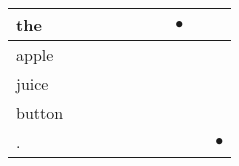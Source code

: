 \documentclass[landscape]{article}
\newcommand{\ssp}{\hspace{2pt}}
\newcommand{\mex}{\cellcolor{g}$\bullet$}
\begin{document}
\begin{tabular}{|l|p{10pt}|p{10pt}|p{10pt}|p{10pt}|p{10pt}|p{10pt}|p{10pt}|p{10pt}|p{10pt}|}
\hline
\ssp \cellcolor{ref6}the \ssp&\hspace{2pt}&\hspace{2pt}&\hspace{2pt}&\hspace{2pt}&\hspace{2pt}&\hspace{2pt}&\hspace{2pt}\mex&\hspace{2pt}&\hspace{2pt}\\
\hline
\ssp apple \ssp&\hspace{2pt}&\hspace{2pt}&\hspace{2pt}&\hspace{2pt}&\hspace{2pt}&\hspace{2pt}&\hspace{2pt}&\hspace{2pt}&\hspace{2pt}\\
\hline
\ssp juice \ssp&\hspace{2pt}&\hspace{2pt}&\hspace{2pt}&\hspace{2pt}&\hspace{2pt}&\hspace{2pt}&\hspace{2pt}&\hspace{2pt}&\hspace{2pt}\\
\hline
\ssp button \ssp&\hspace{2pt}&\hspace{2pt}&\hspace{2pt}&\hspace{2pt}&\hspace{2pt}&\hspace{2pt}&\hspace{2pt}&\hspace{2pt}&\hspace{2pt}\\
\hline
\ssp \cellcolor{ref8}. \ssp&\hspace{2pt}&\hspace{2pt}&\hspace{2pt}&\hspace{2pt}&\hspace{2pt}&\hspace{2pt}&\hspace{2pt}&\hspace{2pt}&\hspace{2pt}\mex\\
\hline
\end{tabular}
\end{document}
